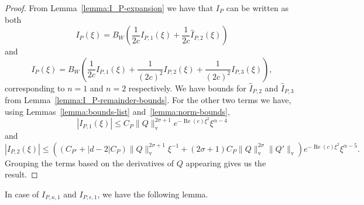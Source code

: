 \documentclass[11pt]{article}
\DeclareMathOperator{\real}{Re}
\newcommand{\normv}{\mathrm{v}}
\begin{document}
\begin{proof}
  From Lemma~\ref{lemma:I_P-expansion} we have that \(I_{P}\) can be
  written as both
  \begin{equation*}
    I_{P}(\xi)
    = B_{W}\left(
      \frac{1}{2c}I_{P,1}(\xi)
      + \frac{1}{2c}\hat{I}_{P,2}(\xi)
    \right)
  \end{equation*}
  and
  \begin{equation*}
    I_{P}(\xi)
    = B_{W}\left(
      \frac{1}{2c}I_{P,1}(\xi)
      + \frac{1}{(2c)^{2}}I_{P,2}(\xi)
      + \frac{1}{(2c)^{2}}\hat{I}_{P,3}(\xi)
    \right),
  \end{equation*}
  corresponding to \(n = 1\) and \(n = 2\) respectively. We have
  bounds for \(\hat{I}_{P,2}\) and \(\hat{I}_{P,3}\) from
  Lemma~\ref{lemma:I_P-remainder-bounds}. For the other two terms we
  have, using Lemmas~\ref{lemma:bounds-list}
  and~\ref{lemma:norm-bounds},
  \begin{equation*}
    |I_{P,1}(\xi)| \leq C_{P}\|Q\|_{\normv}^{2\sigma + 1}e^{-\real(c)\xi^{2}}\xi^{\alpha - 4}
  \end{equation*}
  and
  \begin{equation*}
    |I_{P,2}(\xi)| \leq (
    (C_{P'} + |d - 2|C_{P})\|Q\|_{\normv}^{2\sigma + 1}\xi^{-1}
    + (2\sigma + 1)C_{P}\|Q\|_{\normv}^{2\sigma}\|Q'\|_{\normv}
    )e^{-\real(c)\xi^{2}}\xi^{\alpha - 5}.
  \end{equation*}
  Grouping the terms based on the derivatives of \(Q\) appearing gives
  us the result.
\end{proof}

In case of \(I_{P,\kappa,1}\) and \(I_{P,\epsilon,1}\), we have the
following lemma.
\end{document}
